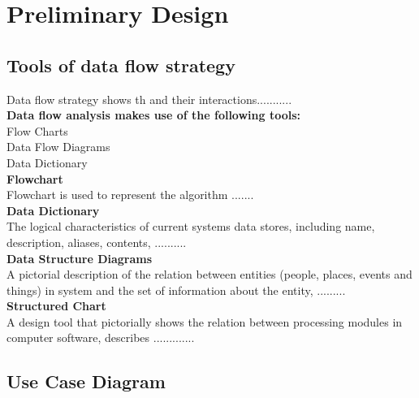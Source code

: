 \chapter{Preliminary  Design}

\section{Tools of data flow strategy}
	Data flow strategy shows th and their interactions...........\\
\textbf{Data flow analysis makes use of the following tools:}\\
Flow Charts\\
Data Flow Diagrams\\
Data Dictionary\\
\textbf{Flowchart}\\
Flowchart is used to represent the algorithm .......\\
\textbf{Data Dictionary}\\
The logical characteristics of current systems data stores, including name, description, aliases, contents, ..........\\
\textbf{Data Structure Diagrams}\\
A pictorial description of the relation between entities (people, places, events and things) in system and the set of information about the entity, .........\\
\textbf{Structured Chart}\\
A design tool that pictorially shows the relation between processing modules in computer software, describes .............



\section{Use Case Diagram}
